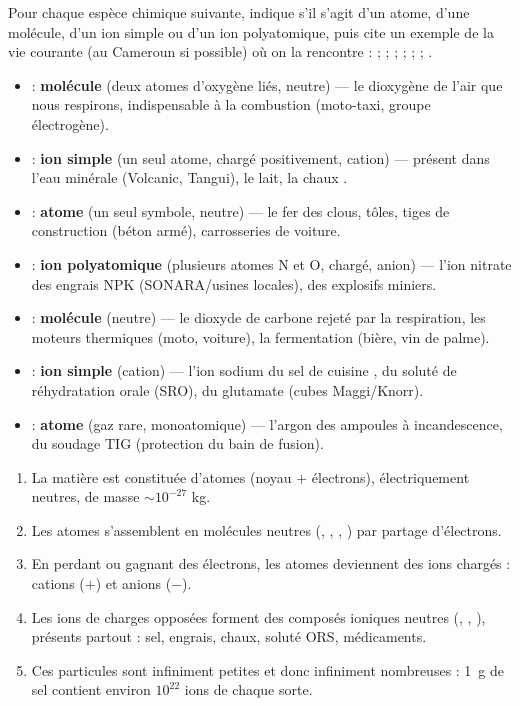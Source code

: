 \documentclass[11pt]{article}
\newcommand{\cle}[1]{{\popxbold\color{popdark}#1}}
\begin{document}
\begin{exercice}
Pour chaque espèce chimique suivante, indique s'il s'agit d'un atome, d'une molécule, d'un ion simple ou d'un ion polyatomique, puis cite un exemple de la vie courante (au Cameroun si possible) où on la rencontre :  ;  ;  ;  ;  ;  ; .
\end{exercice}

\begin{corrige}
\begin{itemize}
\item {} : \textbf{molécule} (deux atomes d'oxygène liés, neutre) — le dioxygène de l'air que nous respirons, indispensable à la combustion (moto-taxi, groupe électrogène).
\item {} : \textbf{ion simple} (un seul atome, chargé positivement, cation) — présent dans l'eau minérale (Volcanic, Tangui), le lait, la chaux .
\item {} : \textbf{atome} (un seul symbole, neutre) — le fer des clous, tôles, tiges de construction (béton armé), carrosseries de voiture.
\item {} : \textbf{ion polyatomique} (plusieurs atomes N et O, chargé, anion) — l'ion nitrate des engrais NPK (SONARA/usines locales), des explosifs miniers.
\item {} : \textbf{molécule} (neutre) — le dioxyde de carbone rejeté par la respiration, les moteurs thermiques (moto, voiture), la fermentation (bière, vin de palme).
\item {} : \textbf{ion simple} (cation) — l'ion sodium du sel de cuisine , du soluté de réhydratation orale (SRO), du glutamate (cubes Maggi/Knorr).
\item {} : \textbf{atome} (gaz rare, monoatomique) — l'argon des ampoules à incandescence, du soudage TIG (protection du bain de fusion).
\end{itemize}
\end{corrige}

\begin{aretenir}
\begin{enumerate}
\item La matière est constituée d'\cle{atomes} (noyau + électrons), électriquement neutres, de masse $\sim 10^{-27}$ kg.
\item Les atomes s'assemblent en \cle{molécules} neutres (, , , ) par partage d'électrons.
\item En perdant ou gagnant des électrons, les atomes deviennent des \cle{ions} chargés : cations ($+$) et anions ($-$).
\item Les ions de charges opposées forment des \cle{composés ioniques} neutres (, , ), présents partout : sel, engrais, chaux, soluté ORS, médicaments.
\item Ces particules sont infiniment petites et donc infiniment nombreuses : \SI{1}{g} de sel contient environ $10^{22}$ ions de chaque sorte.
\end{enumerate}
\end{aretenir}
\end{document}
